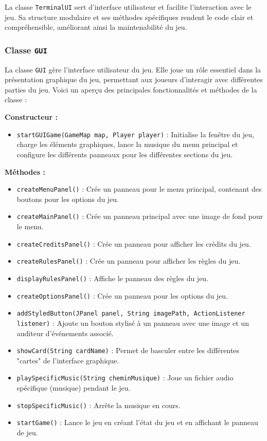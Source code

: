 \documentclass{article}
\begin{document}
La classe \texttt{TerminalUI} sert d'interface utilisateur et facilite l'interaction avec le jeu. Sa structure modulaire et ses méthodes spécifiques rendent le code clair et compréhensible, améliorant ainsi la maintenabilité du jeu.



\subsubsection{Classe \texttt{GUI}}

La classe \texttt{GUI} gère l'interface utilisateur du jeu. Elle joue un rôle essentiel dans la présentation graphique du jeu, permettant aux joueurs d'interagir avec différentes parties du jeu. Voici un aperçu des principales fonctionnalités et méthodes de la classe :

\item \textbf{Constructeur :} 
\begin{itemize}
    \item \texttt{startGUIGame(GameMap map, Player player)} : Initialise la fenêtre du jeu, charge les éléments graphiques, lance la musique du menu principal et configure les différents panneaux pour les différentes sections du jeu.
\end{itemize}

\item \textbf{Méthodes :}
\begin{itemize}
    \item \texttt{createMenuPanel()} : Crée un panneau pour le menu principal, contenant des boutons pour les options du jeu.
    \item \texttt{createMainPanel()} : Crée un panneau principal avec une image de fond pour le menu.
    \item \texttt{createCreditsPanel()} : Crée un panneau pour afficher les crédits du jeu.
    \item \texttt{createRulesPanel()} : Crée un panneau pour afficher les règles du jeu.
    \item \texttt{displayRulesPanel()} : Affiche le panneau des règles du jeu.
    \item \texttt{createOptionsPanel()} : Crée un panneau pour les options du jeu.
    \item \texttt{addStyledButton(JPanel panel, String imagePath, ActionListener listener)} : Ajoute un bouton stylisé à un panneau avec une image et un auditeur d'événements associé.
    \item \texttt{showCard(String cardName)} : Permet de basculer entre les différentes "cartes" de l'interface graphique.
    \item \texttt{playSpecificMusic(String cheminMusique)} : Joue un fichier audio spécifique (musique) pendant le jeu.
    \item \texttt{stopSpecificMusic()} : Arrête la musique en cours.
    \item \texttt{startGame()} : Lance le jeu en créant l'état du jeu et en affichant le panneau de jeu.
\end{itemize}
\end{document}
